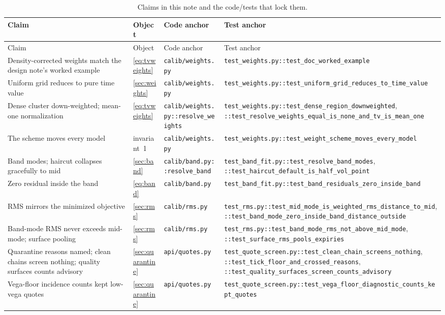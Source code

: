 \documentclass[11pt]{article}
\begin{document}
\begingroup
\small
\setlength{\tabcolsep}{3pt}
\begin{longtable}{@{}p{}p{}p{}p{}@{}}
\caption{Claims in this note and the code/tests that lock them.}\\
\toprule Claim & Object & Code anchor & Test anchor\\ \midrule
\endfirsthead
\toprule Claim & Object & Code anchor & Test anchor\\ \midrule
\endhead
Density-corrected weights match the design note's worked example &
\eqref{eq:tvweights} &
\nolinkurl{calib/weights.py} &
\nolinkurl{test_weights.py::test_doc_worked_example}\\
Uniform grid reduces to pure time value &
\cref{sec:weights} &
\nolinkurl{calib/weights.py} &
\nolinkurl{test_weights.py::test_uniform_grid_reduces_to_time_value}\\
Dense cluster down-weighted; mean-one normalization &
\eqref{eq:tvweights} &
\nolinkurl{calib/weights.py::resolve_weights} &
\nolinkurl{test_weights.py::test_dense_region_downweighted}, \nolinkurl{::test_resolve_weights_equal_is_none_and_tv_is_mean_one}\\
The scheme moves every model &
invariant~1 &
\nolinkurl{calib/weights.py} &
\nolinkurl{test_weights.py::test_weight_scheme_moves_every_model}\\
Band modes; haircut collapses gracefully to mid &
\cref{sec:band} &
\nolinkurl{calib/band.py::resolve_band} &
\nolinkurl{test_band_fit.py::test_resolve_band_modes}, \nolinkurl{::test_haircut_default_is_half_vol_point}\\
Zero residual inside the band &
\eqref{eq:band} &
\nolinkurl{calib/band.py} &
\nolinkurl{test_band_fit.py::test_band_residuals_zero_inside_band}\\
RMS mirrors the minimized objective &
\cref{sec:rms} &
\nolinkurl{calib/rms.py} &
\nolinkurl{test_rms.py::test_mid_mode_is_weighted_rms_distance_to_mid}, \nolinkurl{::test_band_mode_zero_inside_band_distance_outside}\\
Band-mode RMS never exceeds mid-mode; surface pooling &
\cref{sec:rms} &
\nolinkurl{calib/rms.py} &
\nolinkurl{test_rms.py::test_band_mode_rms_not_above_mid_mode}, \nolinkurl{::test_surface_rms_pools_expiries}\\
\addlinespace
Quarantine reasons named; clean chains screen nothing; quality surfaces
counts advisory &
\cref{sec:quarantine} &
\nolinkurl{api/quotes.py} &
\nolinkurl{test_quote_screen.py::test_clean_chain_screens_nothing},
\nolinkurl{::test_tick_floor_and_crossed_reasons},
\nolinkurl{::test_quality_surfaces_screen_counts_advisory}\\
Vega-floor incidence counts kept low-vega quotes &
\cref{sec:quarantine} &
\nolinkurl{api/quotes.py} &
\nolinkurl{test_quote_screen.py::test_vega_floor_diagnostic_counts_kept_quotes}\\
\bottomrule
\end{longtable}
\endgroup
\end{document}
